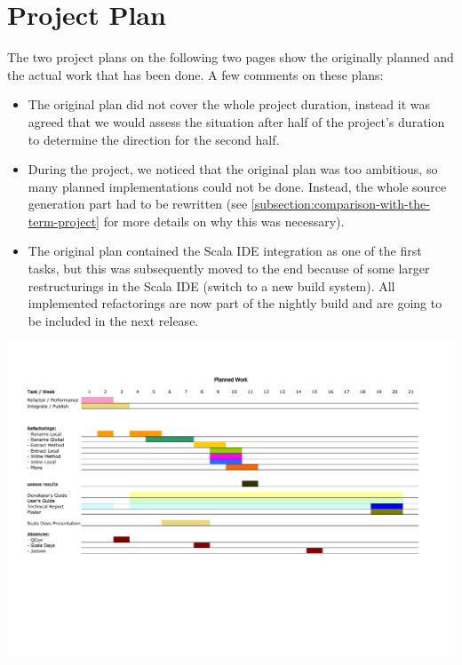 \documentclass[10pt,a4paper,oneside]{scrreprt}
\begin{document}
\section{Project Plan}

The two project plans on the following two pages show the originally planned and the actual work that has been done. A few comments on these plans:

\begin{itemize}
  \item The original plan did not cover the whole project duration, instead it was agreed that we would assess the situation after half of the project's duration to determine the direction for the second half. 
  \item During the project, we noticed that the original plan was too ambitious, so many planned implementations could not be done. Instead, the whole source generation part had to be rewritten (see \vref{subsection:comparison-with-the-term-project} for more details on why this was necessary).
  \item The original plan contained the Scala IDE integration as one of the first tasks, but this was subsequently moved to the end because of some larger restructurings in the Scala IDE (switch to a new build system). All implemented refactorings are now part of the nightly build and are going to be included in the next release.
\end{itemize}



\newpage
\thispagestyle{empty}
\begin{center}
  \includegraphics[width=1.7\linewidth,angle=90]{project_plan_1.pdf}
\end{center}
\end{document}
